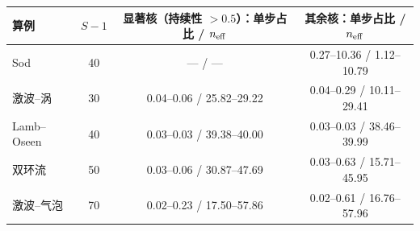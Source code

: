 \begin{tabular}{lccc}\toprule 算例 & $S-1$ & 显著核（持续性 $>0.5$）：单步占比 / $n_{\rm eff}$ & 其余核：单步占比 / $n_{\rm eff}$\\\midrule
Sod & 40 & — / — & 0.27–10.36 / 1.12–10.79\\
激波–涡 & 30 & 0.04–0.06 / 25.82–29.22 & 0.04–0.29 / 10.11–29.41\\
Lamb–Oseen & 40 & 0.03–0.03 / 39.38–40.00 & 0.03–0.03 / 38.46–39.99\\
双环流 & 50 & 0.03–0.06 / 30.87–47.69 & 0.03–0.63 / 15.71–45.95\\
激波–气泡 & 70 & 0.02–0.23 / 17.50–57.86 & 0.02–0.61 / 16.76–57.96\\
\bottomrule\end{tabular}